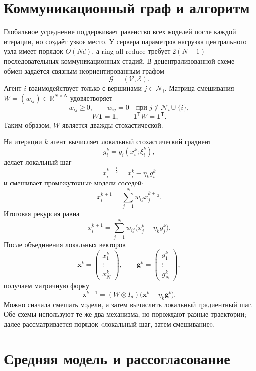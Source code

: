 \section{Коммуникационный граф и алгоритм}

Глобальное усреднение поддерживает равенство всех моделей после
каждой итерации, но создаёт узкое место. У сервера параметров нагрузка
центрального узла имеет порядок \(O(Nd)\), а ring all-reduce требует
\(2(N-1)\) последовательных коммуникационных стадий. В
децентрализованной схеме обмен задаётся связным неориентированным
графом
\[
    \mathcal G=(\mathcal V,\mathcal E).
\]
Агент \(i\) взаимодействует только с вершинами
\(j\in\mathcal N_i\). Матрица смешивания
\(W=(w_{ij})\in\mathbb R^{N\times N}\) удовлетворяет
\[
    w_{ij}\ge0,
    \qquad
    w_{ij}=0
    \quad
    \text{при }
    j\notin\mathcal N_i\cup\{i\},
\]
\[
    W\mathbf1=\mathbf1,
    \qquad
    \mathbf1^{\mathsf T}W=\mathbf1^{\mathsf T}.
\]
Таким образом, \(W\) является дважды стохастической.

На итерации \(k\) агент вычисляет локальный стохастический градиент
\[
    g_i^k=g_i(x_i^k;\xi_i^k),
\]
делает локальный шаг
\[
    x_i^{k+\frac12}
    =
    x_i^k-\eta_k g_i^k
\]
и смешивает промежуточные модели соседей:
\[
    x_i^{k+1}
    =
    \sum_{j=1}^{N}
    w_{ij}x_j^{k+\frac12}.
\]
Итоговая рекурсия равна
\[
    x_i^{k+1}
    =
    \sum_{j=1}^{N}
    w_{ij}
    \bigl(
        x_j^k-\eta_k g_j^k
    \bigr).
\]
После объединения локальных векторов
\[
    \mathbf x^k
    =
    \begin{pmatrix}
        x_1^k\\
        \vdots\\
        x_N^k
    \end{pmatrix},
    \qquad
    \mathbf g^k
    =
    \begin{pmatrix}
        g_1^k\\
        \vdots\\
        g_N^k
    \end{pmatrix},
\]
получаем матричную форму
\[
    \mathbf x^{k+1}
    =
    (W\otimes I_d)
    \bigl(
        \mathbf x^k-\eta_k\mathbf g^k
    \bigr).
\]
Можно сначала смешать модели, а затем вычислить локальный градиентный
шаг. Обе схемы используют те же два механизма, но порождают разные
траектории; далее рассматривается порядок «локальный шаг, затем
смешивание».

\section{Средняя модель и рассогласование}

